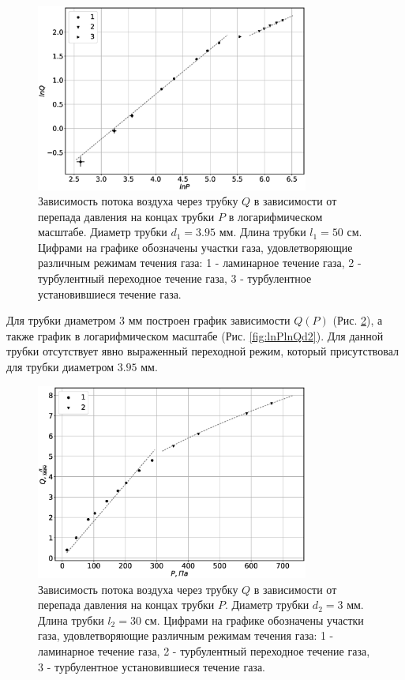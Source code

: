 \documentclass[12pt]{article}
\begin{document}
\begin{figure}[H]
    \centering
    \includegraphics[width=0.8\textwidth]{lnPlnQd1.eps}
    \caption{Зависимость потока воздуха через трубку $Q$ в зависимости от перепада давления на концах
        трубки $P$ в логарифмическом масштабе. Диаметр трубки $d_1 = 3.95$ мм. Длина трубки $l_1 = 50$ см. Цифрами на графике обозначены 
        участки газа, удовлетворяющие различным режимам течения газа: 
        1 - ламинарное течение газа,
        2 - турбулентный переходное течение газа,
        3 - турбулентное установившиеся течение газа.}
    \label{fig:lnPlnQd1}
\end{figure}
Для трубки диаметром $3$ мм построен график зависимости $Q(P)$ (Рис. \ref{fig:PQd2}), 
а также график в логарифмическом масштабе (Рис. \ref{fig:lnPlnQd2}). Для данной трубки 
отсутствует явно выраженный переходной режим, который присутствовал для трубки диаметром $3.95$ мм.  
\begin{figure}[H]
    \centering
    \includegraphics[width=0.8\textwidth]{PQd2.eps}
    \caption{Зависимость потока воздуха через трубку $Q$ в зависимости от перепада давления на концах
        трубки $P$. Диаметр трубки $d_2 = 3$ мм. Длина трубки $l_2 = 30$ см. Цифрами на графике обозначены 
        участки газа, удовлетворяющие различным режимам течения газа: 
        1 - ламинарное течение газа,
        2 - турбулентный переходное течение газа, 
        3 - турбулентное установившиеся течение газа.}
    \label{fig:PQd2}
\end{figure}
\end{document}
